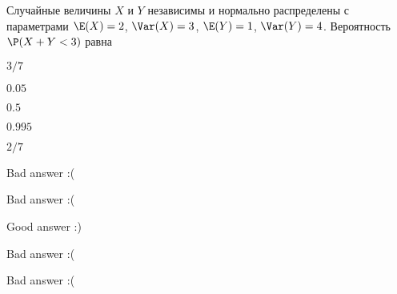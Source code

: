 
\begin{question}
Случайные величины \(X\) и \(Y\) независимы и нормально распределены с
параметрами \(\E(X)=2\), \(\Var(X)=3\), \(\E(Y)=1\), \(\Var(Y)=4\).
Вероятность \(\P(X+Y<3)\) равна
\begin{answerlist}
  \item \(3/7\)
  \item \(0.05\)
  \item \(0.5\)
  \item \(0.995\)
  \item \(2/7\)
\end{answerlist}
\end{question}

\begin{solution}
\begin{answerlist}
  \item Bad answer :(
  \item Bad answer :(
  \item Good answer :)
  \item Bad answer :(
  \item Bad answer :(
\end{answerlist}
\end{solution}

